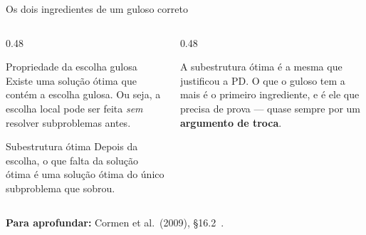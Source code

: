 \documentclass[aspectratio=169,xcolor=table]{beamer}
\newcommand{\um}{edge from parent node[bit, right] {1}}
\newcommand{\fonte}[1]{%
  \vfill
  {\tiny\color{gray!55!black}\textbf{Para aprofundar:} #1\par}%
}
\begin{document}
\begin{frame}{Os dois ingredientes de um guloso correto}
  \begin{columns}[T]
    \begin{column}{0.48\textwidth}
      \begin{block}{Propriedade da escolha gulosa}
        \small Existe uma solução ótima que contém a escolha gulosa. Ou seja, a escolha
        local pode ser feita \emph{sem} resolver subproblemas antes.
      \end{block}
      \begin{block}{Subestrutura ótima}
        \small Depois da escolha, o que falta da solução ótima é uma solução ótima do único
        subproblema que sobrou.
      \end{block}
    \end{column}
    \begin{column}{0.48\textwidth}
      \begin{center}
      \end{center}
      \scriptsize A subestrutura ótima é a mesma que justificou a PD. O que o guloso tem a
      mais é o primeiro ingrediente, e é ele que precisa de prova --- quase sempre por um
      \textbf{argumento de troca}.
    \end{column}
  \end{columns}
  \fonte{Cormen et al.\ (2009), \S 16.2~\cite{cormen2009introduction}.}
\end{frame}
\end{document}
